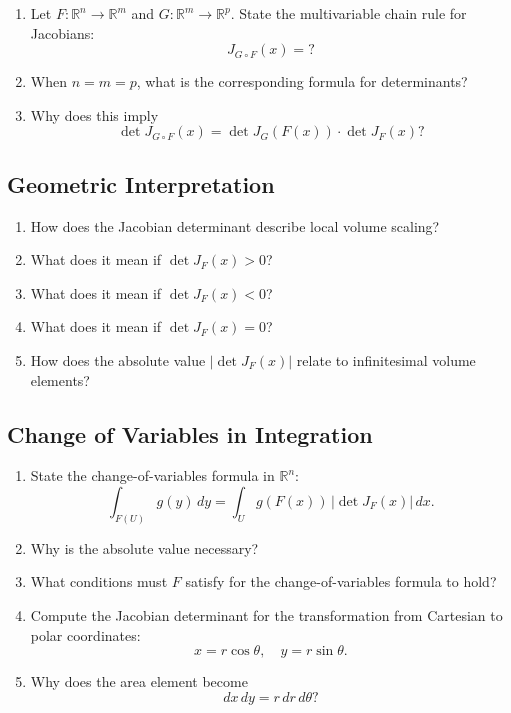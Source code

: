 \begin{enumerate}[resume]
  \item Let \(F : \mathbb{R}^{n} \to \mathbb{R}^{m}\) and \(G : \mathbb{R}^{m} \to \mathbb{R}^{p}\). State the multivariable chain rule for Jacobians:
    \[ J_{G \circ F}(x) = ? \]
  \item When \(n=m=p\), what is the corresponding formula for determinants?
  \item Why does this imply
    \[ \det J_{G \circ F}(x) = \det J_{G}(F(x)) \cdot \det J_{F}(x)? \]
\end{enumerate}

\subsection{Geometric Interpretation}

\begin{enumerate}[resume]
  \item How does the Jacobian determinant describe local volume scaling?
  \item What does it mean if \(\det J_{F}(x) > 0\)?
  \item What does it mean if \(\det J_{F}(x) < 0\)?
  \item What does it mean if \(\det J_{F}(x) = 0\)?
  \item How does the absolute value \(|\det J_{F}(x)|\) relate to infinitesimal volume elements?
\end{enumerate}

\subsection{Change of Variables in Integration}

\begin{enumerate}[resume]
  \item State the change-of-variables formula in \(\mathbb{R}^{n}\):
    \[ \int_{F(U)}g(y)\,dy = \int_{U} g(F(x))\, |\det J_{F}(x)| \, dx. \]
  \item Why is the absolute value necessary?
  \item What conditions must \(F\) satisfy for the change-of-variables formula to hold?
  \item Compute the Jacobian determinant for the transformation from Cartesian to polar coordinates:
    \[ x = r\cos\theta, \quad y = r\sin\theta. \]
  \item Why does the area element become
    \[ dx\,dy = r\,dr\,d\theta? \]
\end{enumerate}


